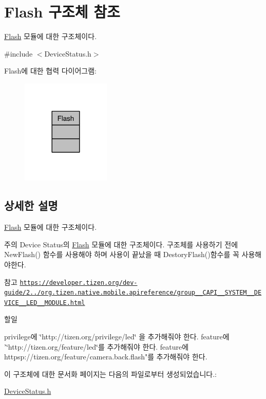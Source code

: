 \hypertarget{struct_flash}{\section{Flash 구조체 참조}
\label{struct_flash}
}


\hyperlink{struct_flash}{Flash} 모듈에 대한 구조체이다.  




{\ttfamily \#include $<$Device\-Status.\-h$>$}



Flash에 대한 협력 다이어그램\-:\nopagebreak
\begin{figure}[H]
\begin{center}
\leavevmode
\includegraphics[width=120pt]{struct_flash__coll__graph}
\end{center}
\end{figure}


\subsection{상세한 설명}
\hyperlink{struct_flash}{Flash} 모듈에 대한 구조체이다. 

\begin{DoxyNote}{주의}
Device Status의 \hyperlink{struct_flash}{Flash} 모듈에 대한 구조체이다. 구조체를 사용하기 전에 New\-Flash() 함수를 사용해야 하며 사용이 끝났을 때 Destory\-Flash()함수를 꼭 사용해야한다. 
\end{DoxyNote}
\begin{DoxySeeAlso}{참고}
\href{https://developer.tizen.org/dev-guide/2.3.0/org.tizen.native.mobile.apireference/group__CAPI__SYSTEM__DEVICE__LED__MODULE.html}{\tt https\-://developer.\-tizen.\-org/dev-\/guide/2../org.\-tizen.\-native.\-mobile.\-apireference/group\-\_\-\-\_\-\-C\-A\-P\-I\-\_\-\-\_\-\-S\-Y\-S\-T\-E\-M\-\_\-\-\_\-\-D\-E\-V\-I\-C\-E\-\_\-\-\_\-\-L\-E\-D\-\_\-\-\_\-\-M\-O\-D\-U\-L\-E.\-html} 
\end{DoxySeeAlso}
\begin{DoxyRefDesc}{할일}
\item[\hyperlink{todo__todo000007}{할일}]privilege에 \char`\"{}http\-://tizen.\-org/privilege/led\char`\"{} 을 추가해줘야 한다. feature에 '\char`\"{}http\-://tizen.\-org/feature/led\char`\"{}를 추가해줘야 한다. feature에 httpsp\-://tizen.org/feature/camera.\-back.\-flash"를 추가해줘야 한다. \end{DoxyRefDesc}


이 구조체에 대한 문서화 페이지는 다음의 파일로부터 생성되었습니다.\-:\begin{DoxyCompactItemize}
\item 
\hyperlink{_device_status_8h}{Device\-Status.\-h}\end{DoxyCompactItemize}
